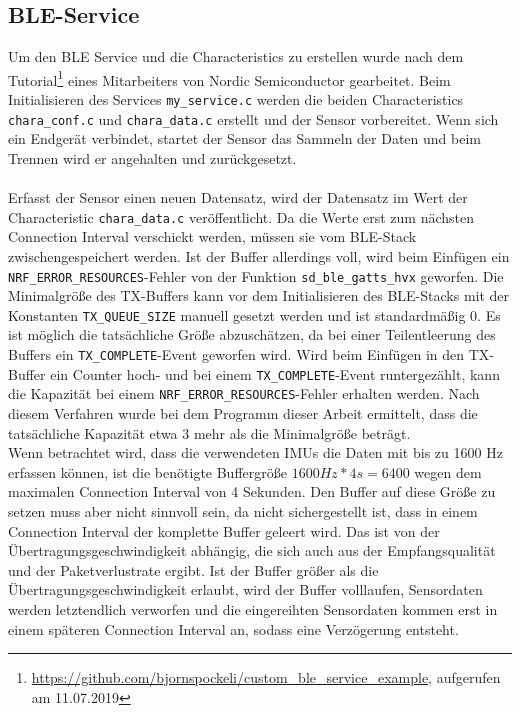 \subsection{BLE-Service}
Um den BLE Service und die Characteristics zu erstellen wurde nach dem Tutorial\footnote{\url{https://github.com/bjornspockeli/custom\_ble\_service\_example}, aufgerufen am 11.07.2019} eines Mitarbeiters von Nordic Semiconductor gearbeitet.
Beim Initialisieren des Services \texttt{my\_service.c} werden die beiden Characteristics \texttt{chara\_conf.c} und \texttt{chara\_data.c} erstellt und der Sensor vorbereitet.
Wenn sich ein Endgerät verbindet, startet der Sensor das Sammeln der Daten und beim Trennen wird er angehalten und zurückgesetzt.\\\\
Erfasst der Sensor einen neuen Datensatz, wird der Datensatz im Wert der Characteristic \texttt{chara\_data.c} veröffentlicht.
Da die Werte erst zum nächsten Connection Interval verschickt werden, müssen sie vom BLE-Stack zwischengespeichert werden.
Ist der Buffer allerdings voll, wird beim Einfügen ein \texttt{NRF\_ERROR\_RESOURCES}-Fehler von der Funktion \texttt{sd\_ble\_gatts\_hvx} geworfen.
Die Minimalgröße des TX-Buffers kann vor dem Initialisieren des BLE-Stacks mit der Konstanten \texttt{TX\_QUEUE\_SIZE} manuell gesetzt werden und ist standardmäßig 0.
Es ist möglich die tatsächliche Größe abzuschätzen, da bei einer Teilentleerung des Buffers ein \texttt{TX\_COMPLETE}-Event geworfen wird.
Wird beim Einfügen in den TX-Buffer ein Counter hoch- und bei einem \texttt{TX\_COMPLETE}-Event runtergezählt, kann die Kapazität bei einem \texttt{NRF\_ERROR\_RESOURCES}-Fehler erhalten werden.
Nach diesem Verfahren wurde bei dem Programm dieser Arbeit ermittelt, dass die tatsächliche Kapazität etwa 3 mehr als die Minimalgröße beträgt.\\
Wenn betrachtet wird, dass die verwendeten IMUs die Daten mit bis zu 1600 Hz erfassen können, ist die benötigte Buffergröße $1600 Hz * 4s = 6400$ wegen dem maximalen Connection Interval von 4 Sekunden.
Den Buffer auf diese Größe zu setzen muss aber nicht sinnvoll sein, da nicht sichergestellt ist, dass in einem Connection Interval der komplette Buffer geleert wird.
Das ist von der Übertragungsgeschwindigkeit abhängig, die sich auch aus der Empfangsqualität und der Paketverlustrate ergibt.
Ist der Buffer größer als die Übertragungsgeschwindigkeit erlaubt, wird der Buffer volllaufen, Sensordaten werden letztendlich verworfen und die eingereihten Sensordaten kommen erst in einem späteren Connection Interval an, sodass eine Verzögerung entsteht.

